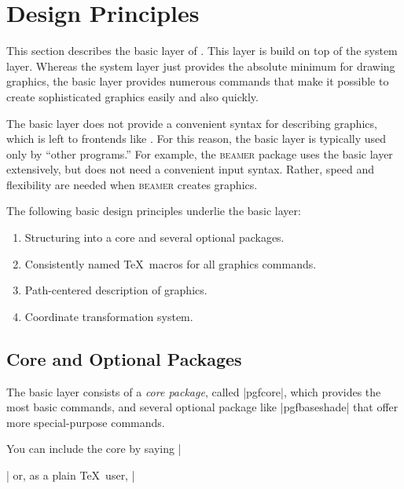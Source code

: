 %


\section{Design Principles}

This section describes the basic layer of \pgfname. This layer is
build on top of the system layer. Whereas the system layer just
provides the absolute minimum for drawing graphics, the basic
layer provides numerous commands that make it possible to create
sophisticated graphics easily and also quickly.

The basic layer does not provide a convenient syntax for describing
graphics, which is left to frontends like \tikzname. For this reason, the
basic layer is typically used only by ``other programs.'' For example,
the \textsc{beamer} package uses the basic layer extensively, but does
not need a convenient input syntax. Rather, speed and flexibility are
needed when \textsc{beamer} creates graphics.

The following basic design principles underlie the basic layer:
\begin{enumerate}
\item Structuring into a core and several optional packages.
\item Consistently named \TeX\ macros for all graphics commands.
\item Path-centered description of graphics.
\item Coordinate transformation system.
\end{enumerate}



\subsection{Core and Optional Packages}

The basic layer consists of a \emph{core package}, called |pgfcore|,
which provides the most basic commands, and several optional package
like |pgfbaseshade| that offer more special-purpose commands.

You can include the core by saying |\usepackage{pgfcore}| or, as a
plain \TeX\ user, |

